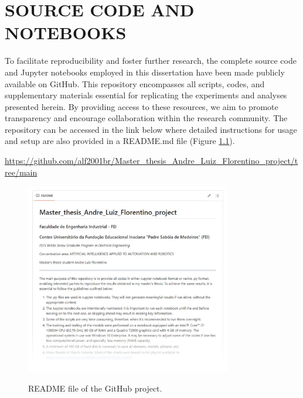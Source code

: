 \chapter{SOURCE CODE AND NOTEBOOKS 
\label{appendix:source_code}}

To facilitate reproducibility and foster further research, the complete source code and Jupyter notebooks employed in this dissertation have been made publicly available on GitHub. This repository encompasses all scripts, codes, and supplementary materials essential for replicating the experiments and analyses presented herein. By providing access to these resources, we aim to promote transparency and encourage collaboration within the research community. The repository can be accessed in the link below where detailed instructions for usage and setup are also provided in a README.md file (Figure \ref{fig:source_code_at_github}). 

\vspace{1cm}

\href{https://github.com/alf2001br/Master_thesis_Andre_Luiz_Florentino_project/tree/main}{https://github.com/alf2001br/Master\_thesis\_Andre\_Luiz\_Florentino\_project/tree/main}

\vspace{1cm}


\begin{figure}[htbp]
    \raggedright
        \caption{README file of the GitHub project.}
        \includegraphics[width=0.80\textwidth]{resources/images/090-source_code/GitHub_project.jpg}
        \label{fig:source_code_at_github}
\end{figure}
